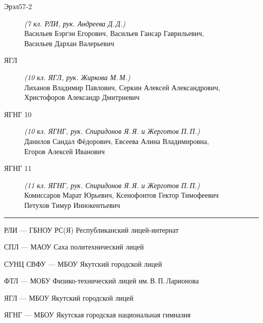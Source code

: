 \begin{description}
\item[Эрэл57-2] \textit{(7 кл. РЛИ, рук. Андреева Д.\,Д.)} \\
Васильев Бэргэн Егорович, Васильев Гансар Гаврильевич, \\
Васильев Дархан Валерьевич

\item[ЯГЛ] \textit{(10 кл. ЯГЛ, рук. Жиркова М.\,М.)} \\
Лиханов Владимир Павлович, Серкин Алексей Александрович, \\
Христофоров Александр Дмитриевич

\item[ЯГНГ 10] \textit{(10 кл. ЯГНГ, рук. Спиридонов Я.\,Я. и Жерготов П.\,П.)} \\
Данилов Сандал Фёдорович, Евсеева Алина Владимировна, \\
Егоров Алексей Иванович

\item[ЯГНГ 11] \textit{(11 кл. ЯГНГ, рук. Спиридонов Я.\,Я. и Жерготов П.\,П.)} \\
Комиссаров Марат Юрьевич, Ксенофонтов Гектор Тимофеевич \\
Петухов Тимур Иннокентьевич

\end{description}

\noindent\rule{3cm}{0.4pt}

\noindent РЛИ --- ГБНОУ РС(Я) Республиканский лицей-интернат

\noindent СПЛ --- МАОУ Саха политехнический лицей

\noindent СУНЦ СВФУ --- МБОУ Якутский городской лицей

\noindent ФТЛ --- МОБУ Физико-технический лицей им.\,В.\,П.\,Ларионова

\noindent ЯГЛ --- МБОУ Якутский городской лицей

\noindent ЯГНГ --- МБОУ Якутская городская национальная гимназия

